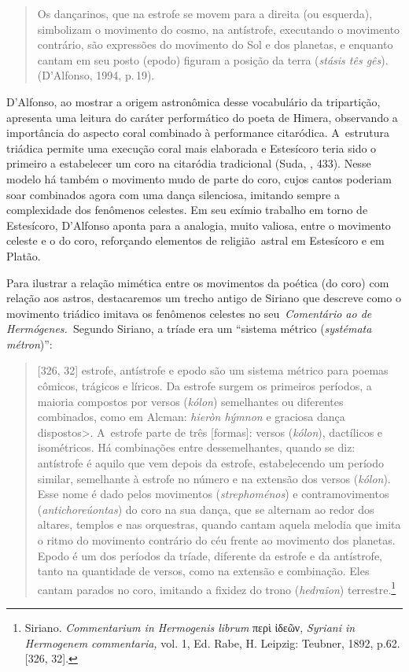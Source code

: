 \begin{quote}
Os dançarinos, que na estrofe se movem para a direita (ou esquerda),
simbolizam o movimento do cosmo, na antístrofe, executando o movimento
contrário, são expressões do movimento do Sol e dos planetas, e enquanto
cantam em seu posto (epodo) figuram a posição da terra (\emph{stásis tês
gês}). (D'Alfonso, 1994, p.\,19).
\end{quote}

 

D'Alfonso, ao mostrar a origem astronômica desse vocabulário da
tripartição, apresenta uma leitura do caráter performático do poeta de
Himera, observando a importância do aspecto coral combinado à
performance citaródica. A~estrutura triádica permite uma execução coral
mais elaborada e Estesícoro teria sido o primeiro a estabelecer um coro
na citaródia tradicional (Suda, , 433). Nesse modelo há também o
movimento mudo de parte do coro, cujos cantos poderiam soar combinados
agora com uma dança silenciosa, imitando sempre a complexidade dos
fenômenos celestes. Em seu exímio trabalho em torno de Estesícoro,
D'Alfonso aponta para a analogia, muito valiosa, entre o movimento
celeste e o do coro, reforçando elementos de religião~astral em
Estesícoro e em Platão.

Para ilustrar a relação mimética entre os movimentos da poética (do
coro) com relação aos astros, destacaremos um trecho antigo de Siriano
que descreve como o movimento triádico imitava os fenômenos celestes no
seu~\emph{Comentário ao de Hermógenes.~}Segundo Siriano, a tríade era um
``sistema métrico (\emph{systémata métron})'':

 

\begin{quote}
[326, 32] estrofe, antístrofe e epodo são um sistema métrico para
poemas cômicos, trágicos e líricos. Da estrofe surgem os primeiros
períodos, a maioria compostos por versos (\emph{kólon}) semelhantes ou
diferentes combinados, como em Alcman: \emph{hieròn hýmnon} e graciosa dança
dispostos\textgreater{}. A~estrofe parte de três [formas]: versos
(\emph{kólon}), dactílicos e isométricos. Há combinações entre
dessemelhantes, quando se diz: antístrofe é aquilo que vem depois da
estrofe, estabelecendo um período similar, semelhante à estrofe no
número e na extensão dos versos (\emph{kólon}). Esse nome é dado pelos
movimentos (\emph{strephoménos}) e contramovimentos
(\emph{antichoreúontas}) do coro na sua dança, que se alternam ao redor
dos altares, templos e nas orquestras, quando cantam aquela melodia que
imita o ritmo do movimento contrário do céu frente ao movimento dos
planetas. Epodo é um dos períodos da tríade, diferente da estrofe e da
antístrofe, tanto na quantidade de versos, como na extensão e
combinação. Eles cantam parados no coro, imitando a fixidez do trono
(\emph{hedraîon}) terrestre.\footnote{Siriano.
  \emph{Commentarium in Hermogenis librum} περὶ ἰδεῶν, \emph{Syriani in
  Hermogenem commentaria,} vol. 1, Ed. Rabe, H. Leipzig: Teubner, 1892,
  p.62. {[}326, 32{]}.}
\end{quote}

